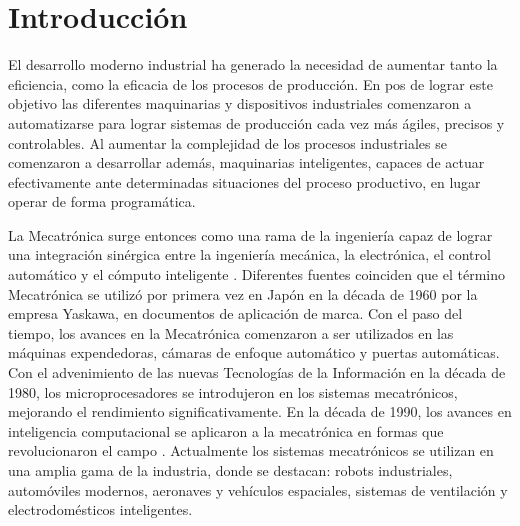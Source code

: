 \chapter{Introducción}%

\label{Chapter1} %


\newcommand{\keyword}[1]{\textbf{#1}}
\newcommand{\tabhead}[1]{\textbf{#1}}
\newcommand{\code}[1]{\texttt{#1}}
\newcommand{\file}[1]{\texttt{\bfseries#1}}
\newcommand{\option}[1]{\texttt{\itshape#1}}

   
El desarrollo moderno industrial ha generado la necesidad de aumentar tanto la eficiencia, como la eficacia de los procesos de producción. En pos de lograr este objetivo las diferentes maquinarias y dispositivos industriales comenzaron a automatizarse para lograr sistemas de producción cada vez más ágiles, precisos y controlables. Al aumentar la complejidad de los procesos industriales se comenzaron a desarrollar además, maquinarias inteligentes, capaces de actuar efectivamente ante determinadas situaciones del proceso productivo, en lugar operar de forma programática. 

La Mecatrónica surge entonces como una rama de la ingeniería capaz de lograr una integración sinérgica entre la ingeniería mecánica, la electrónica, el control  automático y el cómputo inteligente \cite{silva_mechatronics:_2010}. Diferentes fuentes coinciden que el término Mecatrónica se utilizó por primera vez en Japón en la década de 1960 por la empresa Yaskawa, en documentos de aplicación de marca. Con el paso del tiempo, los avances en la Mecatrónica comenzaron a ser utilizados en las máquinas expendedoras, cámaras de enfoque automático y puertas automáticas. Con el advenimiento de las nuevas Tecnologías de la Información en la década de 1980, los microprocesadores se introdujeron en los sistemas mecatrónicos, mejorando el rendimiento significativamente. En la década de 1990, los avances en inteligencia computacional se aplicaron a la mecatrónica en formas que revolucionaron el campo \cite{bishop_mechatronics_2002}. Actualmente los sistemas mecatrónicos se utilizan en una amplia gama de la industria, donde se destacan: robots industriales, automóviles modernos, aeronaves y vehículos espaciales, sistemas de ventilación y electrodomésticos inteligentes. 

